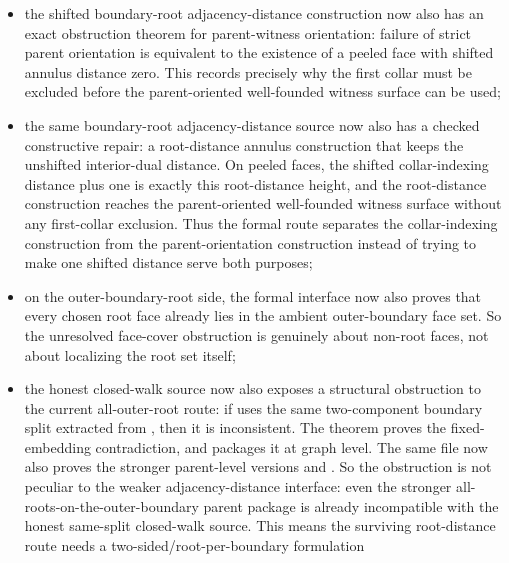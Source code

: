 \documentclass[11pt]{article}
\begin{document}
\begin{itemize}
ambient faces;
\item the shifted boundary-root adjacency-distance construction now also has an
exact obstruction theorem for parent-witness orientation: failure of strict
parent orientation is equivalent to the existence of a peeled face with shifted
annulus distance zero. This records precisely why the first collar must be
excluded before the parent-oriented well-founded witness surface can be used;
\item the same boundary-root adjacency-distance source now also has a checked
constructive repair: a root-distance annulus construction that keeps the
unshifted interior-dual distance. On peeled faces, the shifted collar-indexing
distance plus one is exactly this root-distance height, and the root-distance
construction reaches the parent-oriented well-founded witness surface without
any first-collar exclusion. Thus the formal route separates the collar-indexing
construction from the parent-orientation construction instead of trying to make
one shifted distance serve both purposes;
\item on the outer-boundary-root side, the formal interface now also proves
that every chosen root face already lies in the ambient outer-boundary face
set. So the unresolved face-cover obstruction is genuinely about non-root
faces, not about localizing the root set itself;
\item the honest closed-walk source now also exposes a structural obstruction
to the current all-outer-root route: if
 uses the same
two-component boundary split extracted from
, then it is inconsistent.
The theorem
proves the fixed-embedding contradiction, and
packages it at graph level.  The same file now also proves the stronger
parent-level versions
and
.
So the obstruction is not peculiar to the weaker adjacency-distance interface:
even the stronger all-roots-on-the-outer-boundary parent package is already
incompatible with the honest same-split closed-walk source. This means the
surviving root-distance route needs a two-sided/root-per-boundary formulation

\end{itemize}
\end{document}
